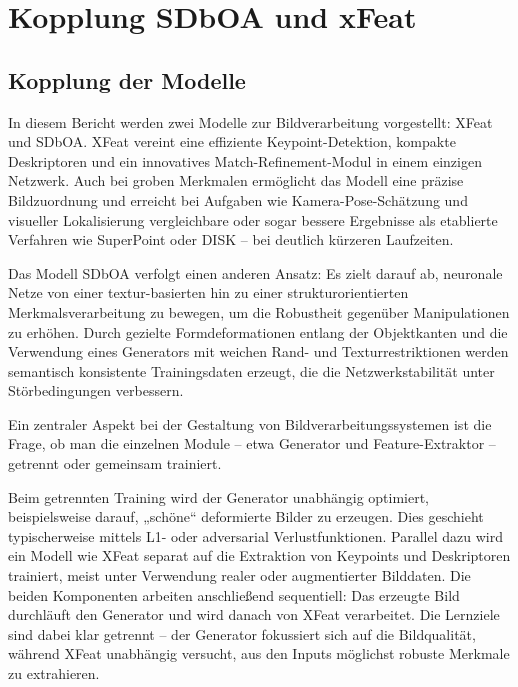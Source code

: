 \chapter{Kopplung SDbOA und xFeat}
\label{ch:EntwickelteMethode}






\section{Kopplung der Modelle}
In diesem Bericht werden zwei Modelle zur Bildverarbeitung vorgestellt: XFeat und SDbOA.
XFeat vereint eine effiziente Keypoint-Detektion, kompakte Deskriptoren und ein innovatives Match-Refinement-Modul in einem einzigen Netzwerk. Auch bei groben Merkmalen ermöglicht das Modell eine präzise Bildzuordnung und erreicht bei Aufgaben wie Kamera-Pose-Schätzung und visueller Lokalisierung vergleichbare oder sogar bessere Ergebnisse als etablierte Verfahren wie SuperPoint oder DISK – bei deutlich kürzeren Laufzeiten. 

Das Modell SDbOA verfolgt einen anderen Ansatz: Es zielt darauf ab, neuronale Netze von einer textur-basierten hin zu einer strukturorientierten Merkmalsverarbeitung zu bewegen, um die Robustheit gegenüber Manipulationen zu erhöhen. Durch gezielte Formdeformationen entlang der Objektkanten und die Verwendung eines Generators mit weichen Rand- und Texturrestriktionen werden semantisch konsistente Trainingsdaten erzeugt, die die Netzwerkstabilität unter Störbedingungen verbessern.

Ein zentraler Aspekt bei der Gestaltung von Bildverarbeitungssystemen ist die Frage, ob man die einzelnen Module – etwa Generator und Feature-Extraktor – getrennt oder gemeinsam trainiert. 

Beim getrennten Training wird der Generator unabhängig optimiert, beispielsweise darauf, „schöne“ deformierte Bilder zu erzeugen. Dies geschieht typischerweise mittels L1- oder adversarial Verlustfunktionen. Parallel dazu wird ein Modell wie XFeat separat auf die Extraktion von Keypoints und Deskriptoren trainiert, meist unter Verwendung realer oder augmentierter Bilddaten. Die beiden Komponenten arbeiten anschließend sequentiell: Das erzeugte Bild durchläuft den Generator und wird danach von XFeat verarbeitet. Die Lernziele sind dabei klar getrennt – der Generator fokussiert sich auf die Bildqualität, während XFeat unabhängig versucht, aus den Inputs möglichst robuste Merkmale zu extrahieren. 

